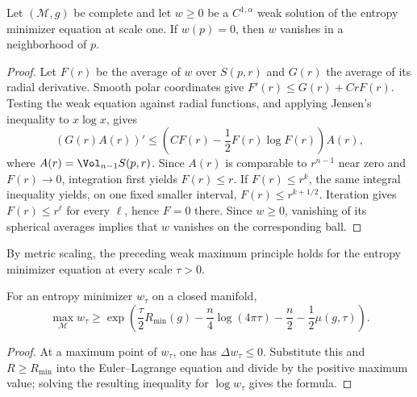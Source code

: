 \begin{lemma}
\label{lem:chow-iii-ch17-weak-strong-maximum-principle}
Let $(\mathcal M,g)$ be complete and let $w\ge0$ be a $C^{1,\alpha}$ weak
solution of the entropy minimizer equation at scale one.  If $w(p)=0$, then
$w$ vanishes in a neighborhood of $p$.
\end{lemma}
\begin{proof}
\sketch Let $F(r)$ be the average of $w$ over $S(p,r)$ and $G(r)$ the average of its
radial derivative.  Smooth polar coordinates give
$F'(r)\le G(r)+CrF(r)$.  Testing the weak equation against radial functions,
and applying Jensen's inequality to $x\log x$, gives
\[
 (G(r)A(r))'\le\left(CF(r)-\frac12F(r)\log F(r)\right)A(r),
\]
where $A(r)=\Vol_{n-1}S(p,r)$.  Since $A(r)$ is comparable to $r^{n-1}$
near zero and $F(r)\to0$, integration first yields $F(r)\le r$.  If
$F(r)\le r^k$, the same integral inequality yields, on one fixed smaller
interval, $F(r)\le r^{k+1/2}$.  Iteration gives $F(r)\le r^\ell$ for every
$\ell$, hence $F=0$ there.  Since $w\ge0$, vanishing of its spherical
averages implies that $w$ vanishes on the corresponding ball.
\end{proof}

\begin{remark}
\label{rem:chow-iii-ch17-weak-maximum-principle-scaling}
By metric scaling, the preceding weak maximum principle holds for the
entropy minimizer equation at every scale $\tau>0$.
\end{remark}

\begin{lemma}
\label{lem:chow-iii-ch17-minimizer-maximum-lower-bound}
For an entropy minimizer $w_\tau$ on a closed manifold,
\[
 \max_{\mathcal M}w_\tau\ge
 \exp\left(\frac\tau2R_{\min}(g)-\frac n4\log(4\pi\tau)
 -\frac n2-\frac12\mu(g,\tau)\right).
\]
\end{lemma}
\begin{proof}
\sketch At a maximum point of $w_\tau$, one has $\Delta w_\tau\le0$.  Substitute
this and $R\ge R_{\min}$ into the Euler--Lagrange equation and divide by the
positive maximum value; solving the resulting inequality for
$\log w_\tau$ gives the formula.
\end{proof}

